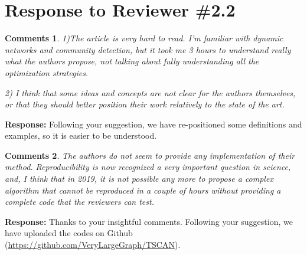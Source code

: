 \documentclass{article}
\newtheorem{Comments}{\textbf{Comments}}
\begin{document}
\section{Response to Reviewer \#2.2}
\setcounter{Comments}{0}
\begin{Comments}
1)The article is very hard to read. I’m familiar with dynamic networks and community detection, but it took me 3 hours to understand really what the authors propose, not talking about fully understanding all the optimization strategies.

2) I think that some ideas and concepts are not clear for the authors themselves, or that they should better position their work relatively to the state of the art.

\end{Comments}
\noindent \textbf{Response: } Following your suggestion, we have re-positioned some definitions and examples, so it is easier to be understood.


\begin{Comments}
	The authors do not seem to provide any implementation of their method. Reproducibility is now recognized a very important question in science, and, I think that in 2019, it is not possible any more to propose a complex algorithm that cannot be reproduced in a couple of hours without providing a complete code that the reviewers can test.
\end{Comments}
\noindent \textbf{Response: } Thanks to your insightful comments. Following your suggestion, we have uploaded the codes on Github (\url{https://github.com/VeryLargeGraph/TSCAN}).



%
\end{document}
